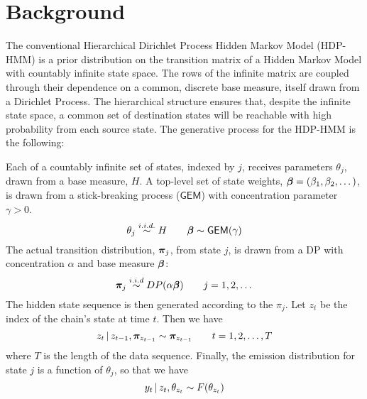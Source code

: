 \section{Background}

The conventional Hierarchical Dirichlet Process Hidden Markov Model
(HDP-HMM) \cite{teh2006hierarchical} 
is a prior distribution on the transition matrix of a Hidden Markov
Model with countably infinite state space.  The rows of the
infinite matrix are coupled through their dependence on a common, discrete base measure,
itself drawn from a Dirichlet Process.
The hierarchical structure ensures that, despite the infinite state
space, a common set of destination states will be reachable with high probability
from each source state.  The generative process for the HDP-HMM is the following:

Each of a countably infinite set of states, indexed by $j$, receives parameters 
$\theta_j$, drawn from a base measure, $H$.  A top-level
set of state weights, $\boldsymbol{\beta} = (\beta_1, \beta_2, \dots)$, is drawn from a stick-breaking
process ($\mathsf{GEM}$) with concentration parameter $\gamma > 0$.
\begin{equation}
\theta_j \stackrel{i.i.d.}{\sim} H \qquad \boldsymbol{\beta} \sim \mathsf{GEM}(\gamma)
\end{equation}
The actual transition distribution, $\boldsymbol{\pi}_j$, from state $j$,
is drawn from a DP with concentration $\alpha$ and base measure $\boldsymbol{\beta}$:
\begin{equation}
  \label{eq:1}
  \boldsymbol{\pi}_j \stackrel{i.i.d}{\sim} DP(\alpha \boldsymbol{\beta}) \qquad j = 1, 2, \dots
\end{equation}
The hidden state sequence is then generated according to the $\pi_j$.
Let $z_t$ be the index of the chain's state at time $t$.  Then we have
\begin{equation}
  \label{eq:4}
  z_t \, \vert \, z_{t-1}, \boldsymbol{\pi}_{z_{t-1}} \sim \boldsymbol{\pi}_{z_{t-1}} \qquad t = 1, 2, \dots, T
\end{equation}
where $T$ is the length of the data sequence.  Finally, the emission distribution 
for state $j$ is a function of $\theta_j$, so that we have
\begin{equation}
  \label{eq:5}
  y_t \, \vert \, z_{t}, \theta_{z_t} \sim F(\theta_{z_t})
\end{equation}

